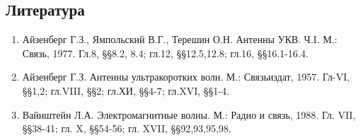 \newpage
\begin{center}
    \section*{Литература}
\end{center}
\begin{enumerate}
    \item Айзенберг Г.З., Ямпольский В.Г., Терешин О.Н. Антенны УКВ. Ч.I. М.: Связь, 1977. Гл.8, §§8.2, 8.4; гл.12, 
    §§12.5,12.8; гл.16, §§16.1-16.4.
    \item Айзенберг Г.З. Антенны ультракоротких волн. М.: Связьиздат, 1957. Гл-VI, §§1,2; гл.VIII, §§2; гл.ХИ, §§4-7; гл.XVI, §§1-4.
    \item Вайнштейн Л.А. Электромагнитные волны. М.: Радио и связь, 1988. Гл. VII, §§38-41; гл. X, §§54-56; гл. XVII, §§92,93,95,98.    
\end{enumerate}


